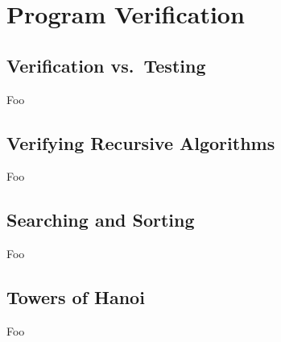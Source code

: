 \section{Program Verification}

\subsection{Verification vs.\ Testing}

Foo

\subsection{Verifying Recursive Algorithms}

Foo

\subsection{Searching and Sorting}

Foo

\subsection{Towers of Hanoi}

Foo

